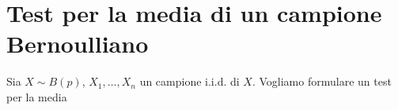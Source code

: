 \section{Test per la media di un campione Bernoulliano}
Sia $X \sim B(p)$, $X_1, \dots, X_n$ un campione i.i.d. di $X$. Vogliamo formulare un test per la
media